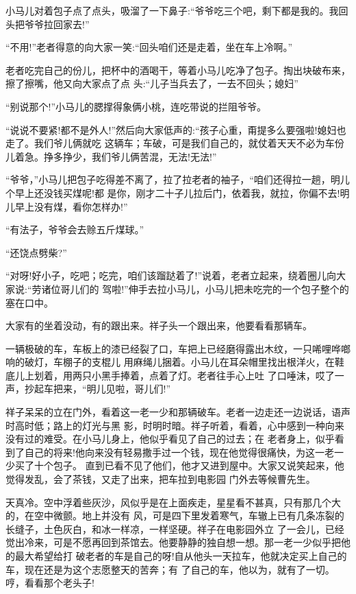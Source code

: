 \documentclass[11pt,a4paper,onecolumn]{article}
\begin{document}
小马儿对着包子点了点头，吸溜了一下鼻子:``爷爷吃三个吧，剩下都是我的。我回头把爷爷拉回家去!''

``不用!''老者得意的向大家一笑:``回头咱们还是走着，坐在车上冷啊。''

老者吃完自己的份儿，把杯中的酒喝干，等着小马儿吃净了包子。掏出块破布来，擦了擦嘴，他又向大家点了点
头:``儿子当兵去了，一去不回头；媳妇\myrule ''

``别说那个!''小马儿的腮撑得象俩小桃，连吃带说的拦阻爷爷。

``说说不要紧!都不是外人!''然后向大家低声的:``孩子心重，甭提多么要强啦!媳妇也走了。我们爷儿俩就吃
这辆车；车破，可是我们自己的，就仗着天天不必为车份儿着急。挣多挣少，我们爷儿俩苦混，无法!无法!''

``爷爷，''小马儿把包子吃得差不离了，拉了拉老者的袖子，``咱们还得拉一趟，明儿个早上还没钱买煤呢!都
是你，刚才二十子儿拉后门，依着我，就拉，你偏不去!明儿早上没有煤，看你怎样办!''

``有法子，爷爷会去赊五斤煤球。''

``还饶点劈柴?''

``对呀!好小子，吃吧；吃完，咱们该蹓跶着了!''说着，老者立起来，绕着圈儿向大家说:``劳诸位哥儿们的
驾啦!''伸手去拉小马儿，小马儿把未吃完的一个包子整个的塞在口中。

大家有的坐着没动，有的跟出来。祥子头一个跟出来，他要看看那辆车。

一辆极破的车，车板上的漆已经裂了口，车把上已经磨得露出木纹，一只唏哩哗啷响的破灯，车棚子的支棍儿
用麻绳儿捆着。小马儿在耳朵帽里找出根洋火，在鞋底儿上划着，用两只小黑手捧着，点着了灯。老者往手心上吐
了口唾沫，哎了一声，抄起车把来，``明儿见啦，哥儿们!''

祥子呆呆的立在门外，看着这一老一少和那辆破车。老者一边走还一边说话，语声时高时低；路上的灯光与黑
影，时明时暗。祥子听着，看着，心中感到一种向来没有过的难受。在小马儿身上，他似乎看见了自己的过去；在
老者身上，似乎看到了自己的将来!他向来没有轻易撒手过一个钱，现在他觉得很痛快，为这一老一少买了十个包子。
直到已看不见了他们，他才又进到屋中。大家又说笑起来，他觉得发乱，会了茶钱，又走了出来，把车拉到电影园
门外去等候曹先生。

天真冷。空中浮着些灰沙，风似乎是在上面疾走，星星看不甚真，只有那几个大的，在空中微颤。地上并没有
风，可是四下里发着寒气，车辙上已有几条冻裂的长缝子，土色灰白，和冰一样凉，一样坚硬。祥子在电影园外立
了一会儿，已经觉出冷来，可是不愿再回到茶馆去。他要静静的独自想一想。那一老一少似乎把他的最大希望给打
破\myrule 老者的车是自己的呀!自从他头一天拉车，他就决定买上自己的车，现在还是为这个志愿整天的苦奔；有
了自己的车，他以为，就有了一切。哼，看看那个老头子!
\end{document}
